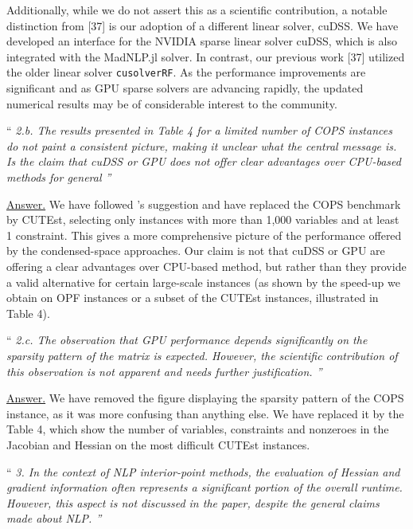 \documentclass[10pt,a4paper]{article}
\newenvironment{quotereviewer}{\vspace{.5cm}{\underline\reviewername} ``\it\footnotesize}{''}
\newcommand{\answer}{\vspace{1mm}\underline{Answer.} }
\begin{document}
Additionally, while we do not assert this as a scientific contribution, a notable distinction from [37] is our adoption of a different linear solver, cuDSS. We have developed an interface for the NVIDIA sparse linear solver cuDSS, which is also integrated with the MadNLP.jl solver. In contrast, our previous work [37] utilized the older linear solver {\tt cusolverRF}. As the performance improvements are significant and as GPU sparse solvers are advancing rapidly, the updated numerical results may be of considerable interest to the community.

\begin{quotereviewer}
2.b. The results presented in Table 4 for a limited number of COPS instances do not paint
a consistent picture, making it unclear what the central message is. Is the claim that
cuDSS or GPU does not offer clear advantages over CPU-based methods for general
\end{quotereviewer}

\answer
We have followed \reviewername's suggestion and have replaced the COPS benchmark
by CUTEst, selecting only instances with more than 1,000 variables
and at least 1 constraint. This gives a more comprehensive picture of the
performance offered by the condensed-space approaches.
Our claim is not that cuDSS or GPU are offering a clear advantages over CPU-based
method, but rather than they provide a valid alternative for certain large-scale instances
(as shown by the speed-up we obtain on OPF instances or a subset of the CUTEst instances, illustrated in Table 4).

\begin{quotereviewer}
2.c. The observation that GPU performance depends signiﬁcantly on the sparsity pattern of
the matrix is expected. However, the scientiﬁc contribution of this observation is not
apparent and needs further justiﬁcation.
\end{quotereviewer}

\answer
We have removed the figure displaying the sparsity pattern of the COPS instance,
as it was more confusing than anything else. We have replaced it by the Table 4, which
show the number of variables, constraints and nonzeroes in the Jacobian and Hessian
on the most difficult CUTEst instances.

\begin{quotereviewer}
3. In the context of NLP interior-point methods, the evaluation of Hessian and gradient information often represents a signiﬁcant portion of the overall runtime. However, this aspect is
not discussed in the paper, despite the general claims made about NLP.
\end{quotereviewer}
\end{document}
